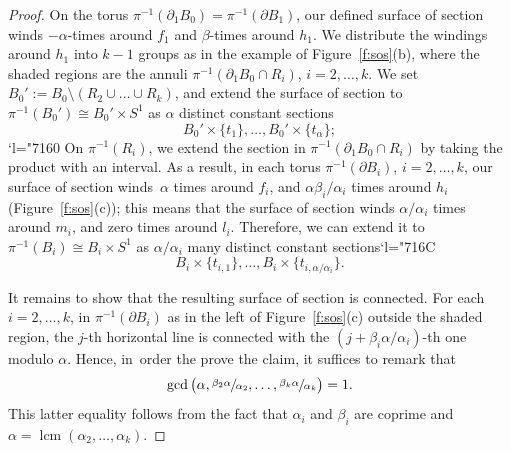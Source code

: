 \documentclass[10pt,a4paper]{amsart}
\numberwithin{equation}{section}
\newcommand{\Changel}{\mathcode`l="7160}
\newcommand{\Changelback}{\mathcode`l="716C}
\theoremstyle{definition}
\DeclareMathOperator{\lcm}{lcm}
\begin{document}
\begin{proof}
On the torus $\pi^{-1}(\partial_1 B_0)=\pi^{-1}(\partial B_1)$, our defined surface of section winds $- \alpha$\nobreakdash-times around $f_1$ and $ \beta$-times around $h_1$. We distribute the windings around $h_1$ into $k-1$ groups as in the example of Figure~\ref{f:sos}(b), where the shaded regions are the annuli $\pi^{-1}(\partial_1 B_0 \cap R_i)$, $i=2,\dots,k$. We set $B_0':=B_0\setminus (R_2\cup\dots\cup R_k)$, and extend the surface of section to $\pi^{-1}(B_0')\cong B_0'\times S^1$ as $\alpha$ distinct constant sections
\[
B_0'\times\{t_1\},\dots, B_0'\times\{t_{\alpha}\};
\]
\Changel
On $\pi^{-1}(R_i)$, we extend the section in $\pi^{-1}(\partial_1 B_0 \cap R_i)$ by taking the product with an interval. As a result, in each torus $\pi^{-1}(\partial B_i)$, $i=2,\dots,k$, our surface of section winds~$\alpha$ times around $f_i$, and $\alpha\beta_i/\alpha_i$ times around $h_i$ (Figure~\ref{f:sos}(c)); this means that the surface of section winds $\alpha/\alpha_i$ times around $m_i$, and zero times around $l_i$. Therefore, we can extend it to $\pi^{-1}(B_i)\cong B_i\times S^1$ as $\alpha/\alpha_i$ many distinct constant sections\Changelback
\[
B_i\times\{t_{i,1}\},\dots,B_i\times\{t_{i,\alpha/\alpha_i}\}.
\]

It remains to show that the resulting surface of section is connected. For each $i=2,\dots,k$, in $\pi^{-1}(\partial B_i)$ as in the left of Figure~\ref{f:sos}(c) outside the shaded region, the $j$-th horizontal line is connected with the $(j+ \beta_i\alpha/\alpha_i)$-th one modulo $\alpha$. Hence, in~order the prove the claim, it suffices to remark that
\[
\gcd\big( \alpha, \sfrac{\beta_2 \alpha}{\alpha_2},\dots, \sfrac{\beta_k \alpha}{\alpha_k}\big) = 1.
\]
This latter equality follows from the fact that $\alpha_i$ and $\beta_i$ are coprime and $ \alpha=\lcm(\alpha_2,\dots,\alpha_k)$.
\end{proof}
\end{document}
